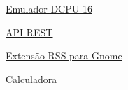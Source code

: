 \documentclass[11pt]{spidercv}
\begin{document}
\begin{MainPart}
    \vspace*{0.5cm}
    \begin{DoubleColumns}
        \begin{ItemList}{\ColorHighlight}
            \item [] \href{https://github.com/marcoscard/DCPU-16-web}{Emulador DCPU-16}  
            \item [] \href{https://github.com/marcoscard/api_rest}{API REST}
        \end{ItemList}
        \nextcolumn
        \begin{ItemList}{\ColorHighlight}
            \item [] \href{https://github.com/marcoscard/RSS-Article}{Extensão RSS para Gnome}
            \item [] \href{https://github.com/marcoscard/CalculadoraApp}{Calculadora}
        \end{ItemList}
    \end{DoubleColumns}

\end{MainPart}
\end{document}
